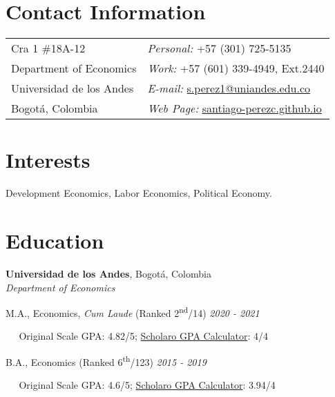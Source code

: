 \documentclass[margin,line]{res}
\newenvironment{list1}{
  \begin{list}{\ding{113}}{%
      \setlength{\itemsep}{0in}
      \setlength{\parsep}{0in} \setlength{\parskip}{0in}
      \setlength{\topsep}{0in} \setlength{\partopsep}{0in} 
      \setlength{\leftmargin}{0.17in}}}{\end{list}}
\begin{document}

\begin{resume}
\section{\sc Contact Information}
\vspace{.05in}
\begin{tabular}{@{}p{3in}p{3in}}
Cra 1 \#18A-12             & {\it Personal:} +57 (301) 725-5135 \\            
Department of Economics   & {\it Work:} +57 (601) 339-4949, Ext.2440  \\         
Universidad de los Andes & {\it E-mail:}  \href{mailto:s.perez1@uniandes.edu.co}{s.perez1@uniandes.edu.co}\\       
Bogotá, Colombia  & {\it Web Page:} \href{https://santiago-perezc.github.io}{santiago-perezc.github.io}  \\   
\end{tabular}


\section{\sc Interests}
Development Economics, Labor Economics, Political Economy.

\section{\sc Education}

{\bf Universidad de los Andes}, Bogotá, Colombia\\
{\em Department of Economics} \\
\begin{list1}

\item[]M.A., Economics, \textit{Cum Laude} (Ranked 2\textsuperscript{nd}/14) \hfill  {\it 2020  - 2021}
\item[]$\;\;\;\;\;$Original Scale GPA: 4.82/5; \href{https://santiago-perezc.github.io/documents/scholaro-masters.pdf}{Scholaro GPA Calculator}: 4/4 
\item[]
\item[] B.A., Economics (Ranked 6\textsuperscript{th}/123) \hfill {\it 2015 - 2019}
\item[]$\;\;\;\;\;$Original Scale GPA: 4.6/5; \href{https://santiago-perezc.github.io/documents/scholaro-undergrad.pdf}{Scholaro GPA Calculator}: 3.94/4 


\end{list1}
\end{resume}
\end{document}

